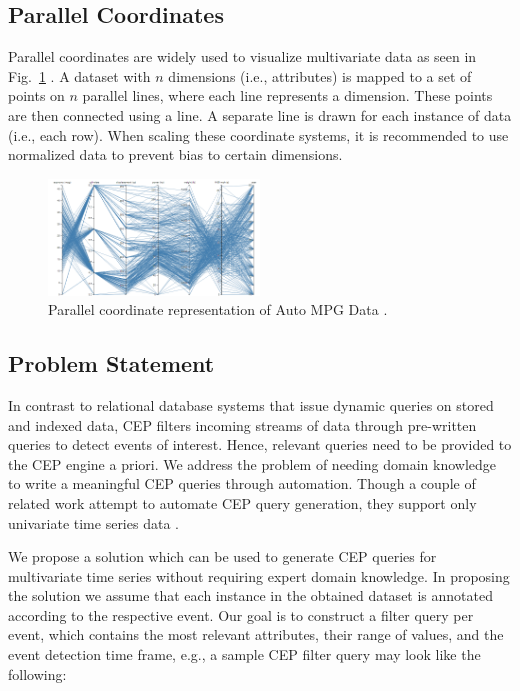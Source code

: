\documentclass[conference]{IEEEtran}  %
\begin{document}
\subsection{Parallel Coordinates}
Parallel coordinates are widely used to visualize multivariate data as seen in Fig.~\ref{fig:parallcor} \cite{IEEEexample:ParallelCoordinates}. A dataset with $n$ dimensions (i.e., attributes) is mapped to a set of points on $n$ parallel lines, where each line represents a dimension. These points are then connected using a line. A separate line is drawn for each instance of data (i.e., each row). When scaling these coordinate systems, it is recommended to use normalized data to prevent bias to certain dimensions.
\begin{figure}
\includegraphics[width=0.5\textwidth]{parrelel.png}
\caption{Parallel coordinate representation of Auto MPG Data \cite{IEEEexample:AutoMPG}.}
\label{fig:parallcor}
\end{figure}

\subsection{Problem Statement} 
In contrast to relational database systems that issue dynamic queries on stored and indexed data, CEP filters incoming streams of data through pre-written queries to detect events of interest. Hence, relevant queries need to be provided to the CEP engine a priori. We address the problem of needing domain knowledge to write a meaningful CEP queries through automation. Though a couple of related work attempt to automate CEP query generation, they support only univariate time series data \cite{IEEEexample:autoCEP}.

We propose a solution which can be used to generate CEP queries for multivariate time series without requiring expert domain knowledge. In proposing the solution we assume that each instance in the obtained dataset is annotated according to the respective event. Our goal is to construct a filter query per event, which contains the most relevant attributes, their range of values, and the event detection time frame, e.g., a sample CEP filter query may look like the following:
\end{document}
